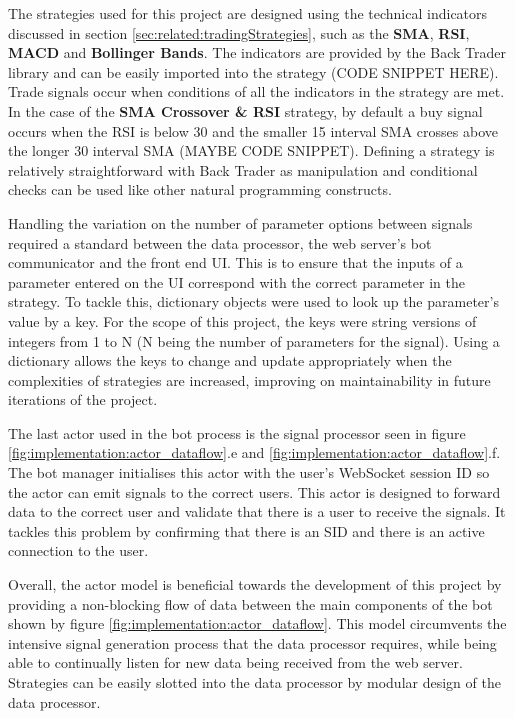 The strategies used for this project are designed using the technical indicators discussed in section \ref{sec:related:tradingStrategies}, such as the \textbf{SMA}, \textbf{RSI}, \textbf{MACD} and \textbf{Bollinger Bands}. The indicators are provided by the Back Trader library and can be easily imported into the strategy (CODE SNIPPET HERE). Trade signals occur when conditions of all the indicators in the strategy are met. In the case of the \textbf{SMA Crossover \& RSI} strategy, by default a buy signal occurs when the RSI is below 30 and the smaller 15 interval SMA crosses above the longer 30 interval SMA (MAYBE CODE SNIPPET). Defining a strategy is relatively straightforward with Back Trader as manipulation and conditional checks can be used like other natural programming constructs.


Handling the variation on the number of parameter options between signals required a standard between the data processor, the web server's bot communicator and the front end UI. This is to ensure that the inputs of a parameter entered on the UI correspond with the correct parameter in the strategy. To tackle this, dictionary objects were used to look up the parameter's value by a key. For the scope of this project, the keys were string versions of integers from 1 to N (N being the number of parameters for the signal). Using a dictionary allows the keys to change and update appropriately when the complexities of strategies are increased, improving on maintainability in future iterations of the project.

The last actor used in the bot process is the signal processor seen in figure \ref{fig:implementation:actor_dataflow}.e and \ref{fig:implementation:actor_dataflow}.f. The bot manager initialises this actor with the user's WebSocket session ID so the actor can emit signals to the correct users. This actor is designed to forward data to the correct user and validate that there is a user to receive the signals. It tackles this problem by confirming that there is an SID and there is an active connection to the user. 

Overall, the actor model is beneficial towards the development of this project by providing a non-blocking flow of data between the main components of the bot shown by figure \ref{fig:implementation:actor_dataflow}. This model circumvents the intensive signal generation process that the data processor requires, while being able to continually listen for new data being received from the web server. Strategies can be easily slotted into the data processor by modular design of the data processor. 



